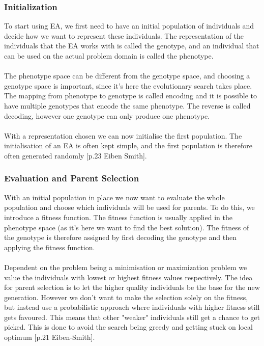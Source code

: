 \subsubsection{Initialization}
To start using EA, we first need to have an initial population of individuals and decide how we want to represent these individuals. The representation of the individuals that the EA works with is called the genotype, and an individual that can be used on the actual problem domain is called the phenotype.
\\
\\
The phenotype space can be different from the genotype space, and choosing a genotype space is important, since it's here the evolutionary search takes place. The mapping from phenotype to genotype is called encoding and it is possible to have multiple genotypes that encode the same phenotype. The reverse is called decoding, however one genotype can only produce one phenotype.
\\
\\
With a representation chosen we can now initialise the first population. The initialisation of an EA is often kept simple, and the first population is therefore often generated randomly [p.23 Eiben Smith].
\subsubsection{Evaluation and Parent Selection}
With an initial population in place we now want to evaluate the whole population and choose which individuals will be used for parents. To do this, we introduce a fitness function. The fitness function is usually applied in the phenotype space (as it's here we want to find the best solution). The fitness of the genotype is therefore assigned by first decoding the genotype and then applying the fitness function.
\\
\\
Dependent on the problem being a minimisation or maximization problem we value the individuals with lowest or highest fitness values respectively. The idea for parent selection is to let the higher quality individuals be the base for the new generation. However we don't want to make the selection solely on the fitness, but instead use a probabilistic approach where individuals with higher fitness still gets favoured. This means that other  "weaker" individuals still get a chance to get picked. This is done to avoid the search being greedy and getting stuck on local optimum [p.21 Eiben-Smith].
